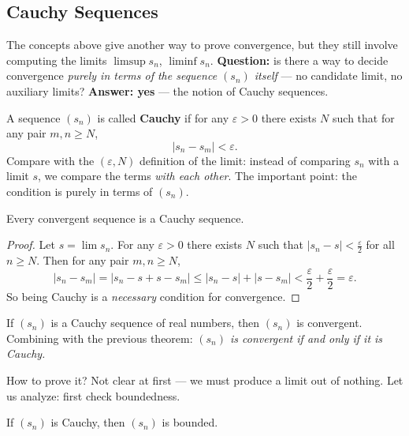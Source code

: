\documentclass[11pt]{report}
\begin{document}
\subsection{Cauchy Sequences}

The concepts above give another way to prove convergence, but they still involve computing the limits $\limsup s_n$, $\liminf s_n$. \textbf{Question:} is there a way to decide convergence \emph{purely in terms of the sequence $(s_n)$ itself} --- no candidate limit, no auxiliary limits? \textbf{Answer: yes} --- the notion of Cauchy sequences.

\begin{defbox}
A sequence $(s_n)$ is called \textbf{Cauchy} if for any $\varepsilon > 0$ there exists $N$ such that for any pair $m, n \geq N$,
\[
|s_n - s_m| < \varepsilon.
\]
Compare with the $(\varepsilon, N)$ definition of the limit: instead of comparing $s_n$ with a limit $s$, we compare the terms \emph{with each other}. The important point: the condition is purely in terms of $(s_n)$.
\end{defbox}

\begin{thmbox}
Every convergent sequence is a Cauchy sequence.
\end{thmbox}

\begin{proof}
Let $s = \lim s_n$. For any $\varepsilon > 0$ there exists $N$ such that $|s_n - s| < \tfrac\varepsilon2$ for all $n \geq N$. Then for any pair $m, n \geq N$,
\[
|s_n - s_m| = |s_n - s + s - s_m| \leq |s_n - s| + |s - s_m| < \frac\varepsilon2 + \frac\varepsilon2 = \varepsilon.
\]
So being Cauchy is a \emph{necessary} condition for convergence.
\end{proof}

\begin{thmbox}
If $(s_n)$ is a Cauchy sequence of real numbers, then $(s_n)$ is convergent. Combining with the previous theorem: \emph{$(s_n)$ is convergent if and only if it is Cauchy.}
\end{thmbox}

How to prove it? Not clear at first --- we must produce a limit out of nothing. Let us analyze: first check boundedness.

\begin{lembox}
If $(s_n)$ is Cauchy, then $(s_n)$ is bounded.
\end{lembox}
\end{document}
